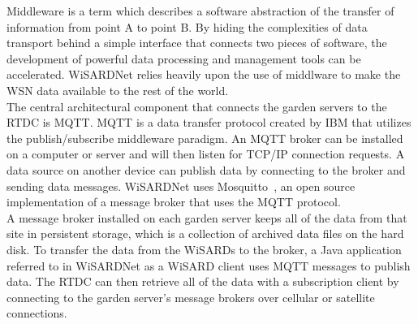 
Middleware is a term which describes a software abstraction of the transfer of information from point A to  point B. By hiding the complexities of data transport behind a simple interface that connects two pieces of software, the development of powerful data processing and management tools can be accelerated. WiSARDNet relies heavily upon the use of middlware to make the WSN data available to the rest of the world.\\

The central architectural component that connects the garden servers to the RTDC is MQTT. MQTT is a data transfer protocol created by IBM that utilizes the publish/subscribe middleware paradigm. An MQTT broker can be installed on a computer or server and will then listen for TCP/IP connection requests. A data source on another device can publish data by connecting to the broker and sending data messages. WiSARDNet uses Mosquitto~\cite{mosquitto}, an open source implementation of a message broker that uses the MQTT protocol.\\ 

A message broker installed on each garden server keeps all of the data from that site in persistent storage, which is a collection of archived data files on the hard disk. To transfer the data from the WiSARDs to the broker, a Java application referred to in WiSARDNet as a WiSARD client uses MQTT messages to publish data. The RTDC can then retrieve all of the data with a subscription client by connecting to the garden server's message brokers over cellular or satellite connections.\\

